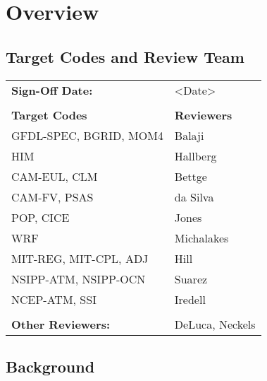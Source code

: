 \chapter{\longname Overview}

\section{Target Codes and Review Team}

\begin{tabular}{l l}

{\bf Sign-Off Date:}          & <Date> \\ \\

{\bf Target Codes}            & {\bf Reviewers} \\
GFDL-SPEC, BGRID, MOM4        & Balaji \\ 
HIM                           & Hallberg \\
CAM-EUL, CLM                  & Bettge \\
CAM-FV, PSAS                  & da Silva\\
POP, CICE                     & Jones \\
WRF                           & Michalakes \\
MIT-REG, MIT-CPL, ADJ         & Hill \\
NSIPP-ATM, NSIPP-OCN          & Suarez \\
NCEP-ATM, SSI                 & Iredell \\ \\

{\bf Other Reviewers:}        & DeLuca, Neckels

\end{tabular}


%

\section{\longname Background}


